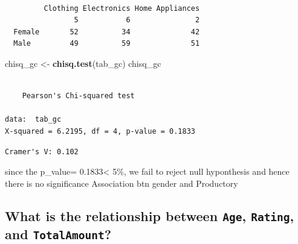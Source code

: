 \documentclass[
]{article}
\newenvironment{Shaded}{\begin{snugshade}}{\end{snugshade}}
\newcommand{\DecValTok}[1]{\textcolor[rgb]{0.00,0.00,0.81}{#1}}
\newcommand{\FunctionTok}[1]{\textcolor[rgb]{0.13,0.29,0.53}{\textbf{#1}}}
\newcommand{\NormalTok}[1]{#1}
\newcommand{\OtherTok}[1]{\textcolor[rgb]{0.56,0.35,0.01}{#1}}
\newcommand{\SpecialCharTok}[1]{\textcolor[rgb]{0.81,0.36,0.00}{\textbf{#1}}}
\newcommand{\StringTok}[1]{\textcolor[rgb]{0.31,0.60,0.02}{#1}}
\begin{document}
\begin{verbatim}
        
         Clothing Electronics Home Appliances
                5           6               2
  Female       52          34              42
  Male         49          59              51
\end{verbatim}

\begin{Shaded}
\begin{Highlighting}[]
\NormalTok{chisq\_gc }\OtherTok{\textless{}{-}} \FunctionTok{chisq.test}\NormalTok{(tab\_gc)}
\NormalTok{chisq\_gc}
\end{Highlighting}
\end{Shaded}

\begin{verbatim}

    Pearson's Chi-squared test

data:  tab_gc
X-squared = 6.2195, df = 4, p-value = 0.1833
\end{verbatim}

\begin{Shaded}
\end{Shaded}

\begin{verbatim}
Cramer's V: 0.102 
\end{verbatim}

since the p\_value= 0.1833\textless{} 5\%, we fail to reject null
hyponthesis and hence there is no significance Association btn gender
and Productory

\subsection{\texorpdfstring{What is the relationship between
\texttt{Age}, \texttt{Rating}, and
\texttt{TotalAmount}?}{What is the relationship between Age, Rating, and TotalAmount?}}\label{what-is-the-relationship-between-age-rating-and-totalamount}
\end{document}
